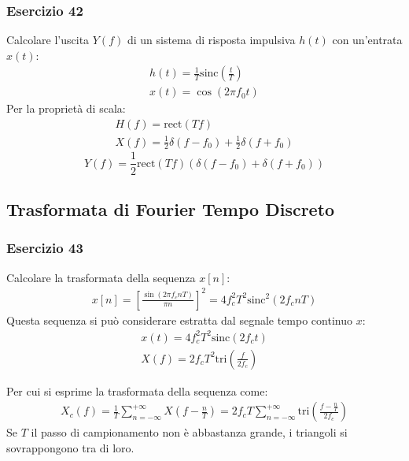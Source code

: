 \documentclass{article}
\newcommand{\rect}{\mathrm{rect}}
\newcommand{\sinc}{\mathrm{sinc}}
\newcommand{\tri}{\mathrm{tri}}
\begin{document}
\subsubsection*{Esercizio 42}

Calcolare l'uscita $Y(f)$ di un sistema di risposta impulsiva $h(t)$ con un'entrata $x(t)$:
\begin{gather*}
    h(t)=\displaystyle\frac{1}{T}\sinc\left(\frac{t}{T}\right)\\
    x(t)=\cos(2\pi f_0t)
\end{gather*}
Per la proprietà di scala:
\begin{gather*}
    H(f)=\rect(Tf)\\
    X(f)=\displaystyle\frac{1}{2}\delta(f-f_0)+\frac{1}{2}\delta(f+f_0)
\end{gather*}
\begin{equation}
    Y(f)=\frac{1}{2}\rect(Tf)(\delta(f-f_0)+\delta(f+f_0))
\end{equation}

\subsection{Trasformata di Fourier Tempo Discreto}

\subsubsection*{Esercizio 43}

Calcolare la trasformata della sequenza $x[n]$:
\begin{gather*}
    x[n]=\left[\displaystyle\frac{\sin(2\pi f_cnT)}{\pi n}\right]^2=4f_c^2T^2\sinc^2(2f_cnT)
\end{gather*}
Questa sequenza si può considerare estratta dal segnale tempo continuo $x$:
\begin{gather*}
    x(t)=4f_c^2T^2\sinc(2f_ct)\\
    X(f)=\displaystyle 2f_cT^2\tri \left(\frac{f}{2f_c}\right)
\end{gather*}

Per cui si esprime la trasformata della sequenza come:
\begin{gather}
    X_c(f)=\displaystyle\frac{1}{T}\sum_{n=-\infty}^{+\infty}X\left(f-\frac{n}{T}\right)=2f_cT\sum_{n=-\infty}^{+\infty}\tri \left(\frac{f-\frac{n}{T}}{2f_c}\right)
\end{gather}
Se $T$ il passo di campionamento non è abbastanza grande, i triangoli si sovrappongono tra di loro. 
\end{document}
